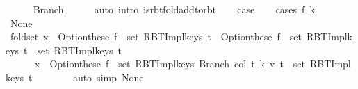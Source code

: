 \begin{isabellebody}
\ \ \ \ \isamarkupfalse%
\ Branch{\isacharparenleft}{\kern0pt}{}{\isacharparenright}{\kern0pt}\isanewline
\ \ \ \ \isamarkupfalse%
\ {\isacharparenleft}{\kern0pt}auto\ intro{\isacharcolon}{\kern0pt}\ is{\isacharunderscore}{\kern0pt}rbt{\isacharunderscore}{\kern0pt}fold{\isacharunderscore}{\kern0pt}add{\isacharunderscore}{\kern0pt}to{\isacharunderscore}{\kern0pt}rbt{\isacharparenright}{\kern0pt}\isanewline
\ \ \isamarkupfalse%
\ {\isacharquery}{\kern0pt}case\isanewline
\ \ \isamarkupfalse%
\ {\isacharparenleft}{\kern0pt}cases\ {\isachardoublequoteopen}f\ k{\isachardoublequoteclose}{\isacharparenright}{\kern0pt}\isanewline
\ \ \ \ \isamarkupfalse%
\ None\isanewline
\ \ \ \ \isamarkupfalse%
\ fold{\isacharunderscore}{\kern0pt}set{\isacharcolon}{\kern0pt}\ {\isachardoublequoteopen}x\ {\isasymin}\ Option{\isachardot}{\kern0pt}these\ {\isacharparenleft}{\kern0pt}f\ {\isacharbackquote}{\kern0pt}\ set\ {\isacharparenleft}{\kern0pt}RBT{\isacharunderscore}{\kern0pt}Impl{\isachardot}{\kern0pt}keys\ t{}{\isacharparenright}{\kern0pt}{\isacharparenright}{\kern0pt}\ {\isasymunion}\ {\isacharparenleft}{\kern0pt}{\isacharparenleft}{\kern0pt}Option{\isachardot}{\kern0pt}these\ {\isacharparenleft}{\kern0pt}f\ {\isacharbackquote}{\kern0pt}\ set\ {\isacharparenleft}{\kern0pt}RBT{\isacharunderscore}{\kern0pt}Impl{\isachardot}{\kern0pt}keys\ t{}{\isacharparenright}{\kern0pt}{\isacharparenright}{\kern0pt}\ {\isasymunion}\ set\ {\isacharparenleft}{\kern0pt}RBT{\isacharunderscore}{\kern0pt}Impl{\isachardot}{\kern0pt}keys\ t{\isacharprime}{\kern0pt}{\isacharparenright}{\kern0pt}{\isacharparenright}{\kern0pt}{\isacharparenright}{\kern0pt}\ {\isasymlongleftrightarrow}\isanewline
\ \ \ \ \ \ x\ {\isasymin}\ Option{\isachardot}{\kern0pt}these\ {\isacharparenleft}{\kern0pt}f\ {\isacharbackquote}{\kern0pt}\ set\ {\isacharparenleft}{\kern0pt}RBT{\isacharunderscore}{\kern0pt}Impl{\isachardot}{\kern0pt}keys\ {\isacharparenleft}{\kern0pt}Branch\ col\ t{}\ k\ v\ t{}{\isacharparenright}{\kern0pt}{\isacharparenright}{\kern0pt}{\isacharparenright}{\kern0pt}\ {\isasymunion}\ set\ {\isacharparenleft}{\kern0pt}RBT{\isacharunderscore}{\kern0pt}Impl{\isachardot}{\kern0pt}keys\ t{\isacharprime}{\kern0pt}{\isacharparenright}{\kern0pt}{\isachardoublequoteclose}\isanewline
\ \ \ \ \ \ \isamarkupfalse%
\ {\isacharparenleft}{\kern0pt}auto\ simp{\isacharcolon}{\kern0pt}\ None{\isacharparenright}{\kern0pt}\isanewline
\ \ \ \ \isamarkupfalse%

\end{isabellebody}
